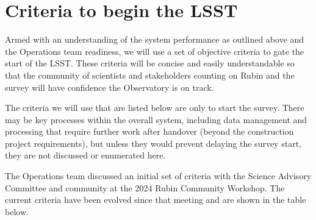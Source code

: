 \section{Criteria to begin the LSST}

Armed with an understanding of the system performance as outlined above and the Operations team readiness, we will use a set of objective criteria to gate the start of the LSST. These criteria will be concise and easily understandable so that the community of scientists and stakeholders counting on Rubin and the survey will have confidence the Observatory is on track.

The criteria we will use that are listed below are only to start the survey. There may be key processes within the overall system, including data management and processing that require further work after handover (beyond the construction project requirements), but unless they would prevent delaying the survey start, they are not discussed or enumerated here.

The Operations team discussed an initial set of criteria with the Science Advisory Committee and community at the 2024 Rubin Community Workshop. The current criteria have been evolved since that meeting and are shown in the table below.

